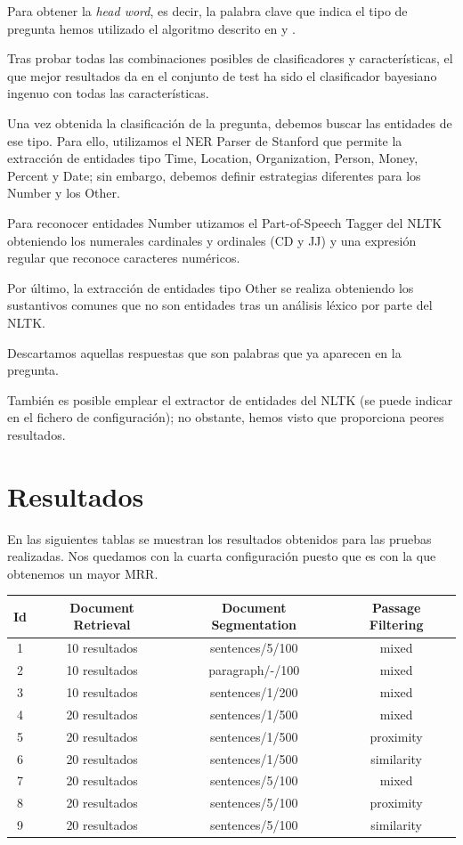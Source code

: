 \documentclass[12pt,a4paper,titlepage]{article}
\newcounter{subsubsubsection}
\begin{document}
Para obtener la \emph{head word}, es decir, la palabra clave que indica el tipo de pregunta hemos utilizado el algoritmo descrito en \cite{tesis:qc} y \cite{paper:qc}.

Tras probar todas las combinaciones posibles de clasificadores y características, el que mejor resultados da en el conjunto de test ha sido el clasificador bayesiano ingenuo con todas las características.

Una vez obtenida la clasificación de la pregunta, debemos buscar las entidades de ese tipo. Para ello, utilizamos el NER Parser de Stanford que permite la extracción de entidades tipo Time, Location, Organization, Person, Money, Percent y Date; sin embargo, debemos definir estrategias diferentes para los Number y los Other.

Para reconocer entidades Number utizamos el Part-of-Speech Tagger del NLTK obteniendo los numerales cardinales y ordinales (CD y JJ) y una expresión regular que reconoce caracteres numéricos.

Por último, la extracción de entidades tipo Other se realiza obteniendo los sustantivos comunes que no son entidades tras un análisis léxico por parte del NLTK.

Descartamos aquellas respuestas que son palabras que ya aparecen en la pregunta.

También es posible emplear el extractor de entidades del NLTK (se puede indicar en el fichero de configuración); no obstante, hemos visto que proporciona peores resultados.

\clearpage
\section{Resultados}
En las siguientes tablas se muestran los resultados obtenidos para las pruebas realizadas. Nos quedamos con la cuarta configuración puesto que es con la que obtenemos un mayor MRR.

\begin{table}[h!]
\begin{center}
\begin{tabular}{|c|c|c|c|}
\hline
Id & Document Retrieval & Document Segmentation & Passage Filtering\\\hline
1 & 10 resultados & sentences/5/100 & mixed\\\hline
2 & 10 resultados & paragraph/-/100 & mixed\\\hline
3 & 10 resultados & sentences/1/200 & mixed\\\hline
4 & 20 resultados & sentences/1/500 & mixed\\\hline
5 & 20 resultados & sentences/1/500 & proximity\\\hline
6 & 20 resultados & sentences/1/500 & similarity\\\hline
7 & 20 resultados & sentences/5/100 & mixed\\\hline
8 & 20 resultados & sentences/5/100 & proximity\\\hline
9 & 20 resultados & sentences/5/100 & similarity\\\hline
\end{tabular}
\end{center}
\end{table}
\end{document}
